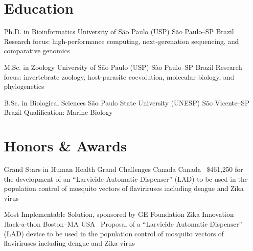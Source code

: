 \documentclass[11pt, letterpaper, sans]{moderncv}
\begin{document}



\vspace{-1.5em}

\section{Education}

		{Ph.D. in Bioinformatics}
		{University of São Paulo (USP)}
		{São Paulo--SP}
		{Brazil}
		{Research focus: high-performance computing, next-gerenation sequencing, and comparative genomics}

		{M.Sc. in Zoology}
		{University of São Paulo (USP)}
		{São Paulo--SP}
		{Brazil}
		{Research focus: invertebrate zoology, host-parasite coevolution, molecular biology, and phylogenetics}

		{B.Sc. in Biological Sciences}
		{São Paulo State University (UNESP)}
		{São Vicente--SP}
		{Brazil}
		{Qualification: Marine Biology}

\restoregeometry

\clearpage


\section{Honors \& Awards}

	{Grand Stars in Human Health}
	{Grand Challenges Canada}
	{Canada}
	{}
	{\textbullet~\$461,250 for the development of an ``Larvicide Automatic Dispenser'' (LAD) to be used in the population control of mosquito vectors of flaviriruses including dengue and Zika virus}

\cventry{---}
	{Most Implementable Solution, sponsored by GE Foundation}
	{Zika Innovation Hack-a-thon}
	{Boston--MA}
	{USA}
	{\textbullet~Proposal of a ``Larvicide Automatic Dispenser'' (LAD) device to be used in the population control of mosquito vectors of flaviriruses including dengue and Zika virus}
\end{document}
